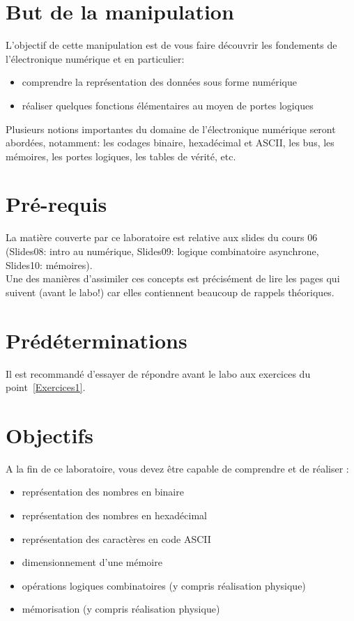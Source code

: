 \vspace{-10mm}
\section*{But de la manipulation}
\vspace{-6mm}
L’objectif de cette manipulation est de vous faire découvrir les fondements de l’électronique numérique et en particulier:
\vspace{3mm}
\begin{itemize}
	\item comprendre la représentation des données sous forme numérique
	\item réaliser quelques fonctions élémentaires au moyen de portes logiques
\end{itemize}

\vspace{3mm}
Plusieurs notions importantes du domaine de l’électronique numérique seront abordées, notamment: les codages binaire, hexadécimal et ASCII, les bus, les mémoires, les portes logiques, les tables de vérité, etc.

\section*{Pré-requis}
\vspace{-6mm}
La matière couverte par ce laboratoire est relative aux slides du cours 06 (Slides08: intro au numérique, Slides09: logique combinatoire asynchrone, Slides10: mémoires).\\
Une des manières d'assimiler ces concepts est précisément de lire les pages qui suivent (avant le labo!) car elles contiennent beaucoup de rappels théoriques.
\vspace{-5mm}

\section*{Prédéterminations}
\vspace{-5mm}
Il est recommandé d'essayer de répondre avant le labo aux exercices du point~\ref{Exercices1}.
\vspace{-5mm}

\section*{Objectifs}
\vspace{-6mm}
A la fin de ce laboratoire, vous devez être capable de comprendre et de réaliser :
\vspace{3mm}
\begin{itemize}
\item représentation des nombres en binaire
\item représentation des nombres en hexadécimal
\item représentation des caractères en code ASCII
\item dimensionnement d'une mémoire
\item opérations logiques combinatoires (y compris réalisation physique)
\item mémorisation (y compris réalisation physique)
\end{itemize}

